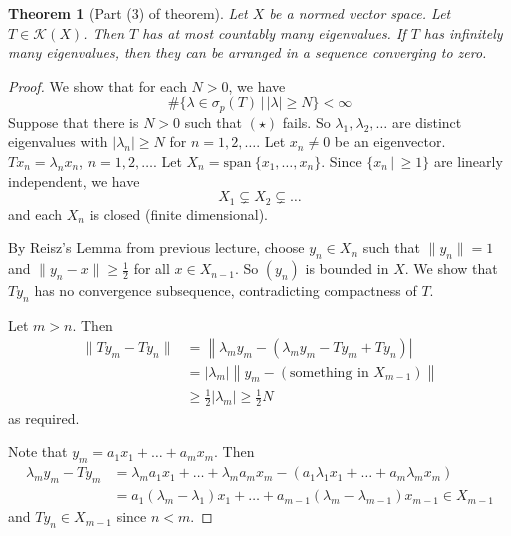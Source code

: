 \documentclass[10pt, oneside, reqno]{amsbook}
\theoremstyle{plain}%
\newtheorem{thm}{Theorem}[section]
\theoremstyle{definition}
\theoremstyle{remark}
\newcommand{\given}{ \, | \,}
\newcommand{\spans}{\text{span}\ }
\begin{document}
\begin{thm}[Part (3) of theorem]
    Let $X$ be a normed vector space.  Let $T \in \mathcal K(X)$.  Then $T$ has at most countably many eigenvalues.  If $T$ has infinitely many eigenvalues, then they can be arranged in a sequence converging to zero.    
\end{thm}
\begin{proof}
    We show that for each $N > 0$, we have \[
        \#\{ \lambda \in \sigma_p(T) \given | \lambda | \geq N \} < \infty \tag{$\star$}
    \] 
     Suppose that there is $N > 0$ such that $(\star)$ fails.  So $\lambda_1, \lambda_2, \dots$ are distinct eigenvalues with $|\lambda_n | \geq N$ for $n = 1, 2, \dots$.  Let $x_n \neq 0$ be an eigenvector.  $Tx_n = \lambda_n x_n$, $n = 1, 2, \dots$.  Let $X_n = \spans\{ x_1, \dots, x_n \}$.  Since $\{ x_n \given \geq 1 \}$ are linearly independent, we have \[
        X_1 \subsetneq X_2 \subsetneq \dots
    \] and each $X_n$ is closed (finite dimensional). 
    
     By Reisz's Lemma from previous lecture, choose $y_n \in X_n$ such that $\| y_n \| = 1$ and $\| y_n - x \| \geq \frac{1}{2}$ for all $x \in X_{n-1}$.  So $(y_n)$ is bounded in $X$.  We show that $Ty_n$ has no convergence subsequence, contradicting compactness of $T$.  
    
    Let $ m  > n$.  Then \begin{align*}
        \| Ty_m - Ty_n \|   &= \left\| \lambda_m y_m - \left( \lambda_m y_m - Ty_m + Ty_n \right) \right| \\
                            &= |\lambda_m | \left\| y_m - (\text{something in $X_{m-1}$}) \right\| \\
                            &\geq \frac{1}{2}|\lambda_m| \geq \frac{1}{2}N
    \end{align*} as required. 
    
    Note that $y_m = a_1 x_1 + \dots + a_m x_m$.  Then \begin{align*}
        \lambda_m y_m - T y_m &=  \lambda_m a_1 x_1 + \dots + \lambda_m a_m x_m - (a_1 \lambda_1 x_1 + \dots + a_m \lambda_m x_m) \\
        &= a_1(\lambda_m - \lambda_1) x_1 + \dots + a_{m-1}(\lambda_m - \lambda_{m-1}) x_{m-1} \in X_{m-1}
    \end{align*} and $T y_n \in X_{m-1}$ since $n< m$.
    
\end{proof} 

\end{document}
